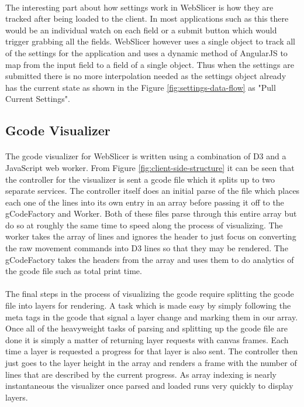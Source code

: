 \paragraph{}
The interesting part about how settings work in WebSlicer is how they are tracked after being loaded to the client.
In most applications such as this there would be an individual watch on each field or a submit button which would trigger grabbing all the fields.
WebSlicer however uses a single object to track all of the settings for the application and uses a dynamic method of AngularJS to map from the input field to a field of a single object.
Thus when the settings are submitted there is no more interpolation needed as the settings object already has the current state as shown in the Figure \ref{fig:settings-data-flow} as "Pull Current Settings".

\subsection{Gcode Visualizer}
\paragraph{}
The gcode visualizer for WebSlicer is written using a combination of D3 and a JavaScript web worker.
From Figure \ref{fig:client-side-structure} it can be seen that the controller for the visualizer is sent a gcode file which it splits up to two separate services.
The controller itself does an initial parse of the file which places each one of the lines into its own entry in an array before passing it off to the gCodeFactory and Worker.
Both of these files parse through this entire array but do so at roughly the same time to speed along the process of visualizing.
The worker takes the array of lines and ignores the header to just focus on converting the raw movement commands into D3 lines so that they may be rendered.
The gCodeFactory takes the headers from the array and uses them to do analytics of the gcode file such as total print time.

\paragraph{}
The final steps in the process of visualizing the gcode require splitting the gcode file into layers for rendering.
A task which is made easy by simply following the meta tags in the gcode that signal a layer change and marking them in our array.
Once all of the heavyweight tasks of parsing and splitting up the gcode file are done it is simply a matter of returning layer requests with canvas frames.
Each time a layer is requested a progress for that layer is also sent.
The controller then just goes to the layer height in the array and renders a frame with the number of lines that are described by the current progress.
As array indexing is nearly instantaneous the visualizer once parsed and loaded runs very quickly to display layers.

